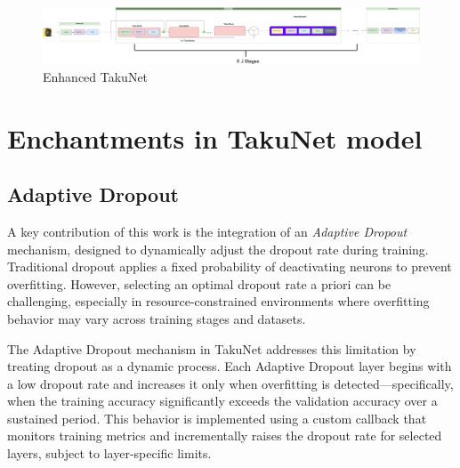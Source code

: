 \begin{figure}[ht]
    \centering
    \includegraphics[width=\linewidth]{Pictures/TakuNet.png}
    \caption{Enhanced TakuNet}
    \label{fig:TakuNet}
\end{figure}


\section{Enchantments in TakuNet model}

\subsection{Adaptive Dropout}

A key contribution of this work is the integration of an \textit{Adaptive Dropout} mechanism, designed to dynamically adjust the dropout rate during training. Traditional dropout applies a fixed probability of deactivating neurons to prevent overfitting. However, selecting an optimal dropout rate a priori can be challenging, especially in resource-constrained environments where overfitting behavior may vary across training stages and datasets.

The Adaptive Dropout mechanism in TakuNet addresses this limitation by treating dropout as a dynamic process. Each Adaptive Dropout layer begins with a low dropout rate and increases it only when overfitting is detected—specifically, when the training accuracy significantly exceeds the validation accuracy over a sustained period. This behavior is implemented using a custom callback that monitors training metrics and incrementally raises the dropout rate for selected layers, subject to layer-specific limits.

